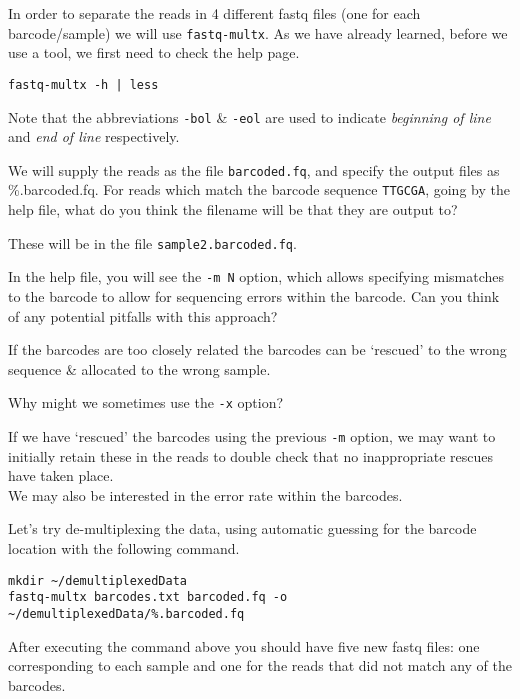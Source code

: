 \begin{steps}
In order to separate the reads in 4 different fastq files (one for each barcode/sample) we will use \texttt{fastq-multx}. 
As we have already learned, before we use a tool, we first need to check the help page.
\begin{lstlisting}
fastq-multx -h | less
\end{lstlisting}
Note that the abbreviations \texttt{-bol} \& \texttt{-eol} are used to indicate \textit{beginning of line} and \textit{end of line} respectively.
\end{steps}

\begin{questions}
We will supply the reads as the file \texttt{barcoded.fq}, and specify the output files as \%.barcoded.fq.
For reads which match the barcode sequence \texttt{TTGCGA}, going by the help file, what do you think the filename will be that they are output to? \\
\begin{answer}
These will be in the file \texttt{sample2.barcoded.fq}.\\
\end{answer}
In the help file, you will see the \texttt{-m N} option, which allows specifying mismatches to the barcode to allow for sequencing errors within the barcode.
Can you think of any potential pitfalls with this approach? \\
\begin{answer}
If the barcodes are too closely related the barcodes can be `rescued' to the wrong sequence \& allocated to the wrong sample. \\
\end{answer}
Why might we sometimes use the \texttt{-x} option? \\ 
\begin{answer}
If we have `rescued' the barcodes using the previous \texttt{-m} option, we may want to initially retain these in the reads to double check that no inappropriate rescues have taken place.\\
We may also be interested in the error rate within the barcodes.\\
\end{answer}
\end{questions}

\begin{steps}
Let's try de-multiplexing the data, using automatic guessing for the barcode location with the following command.\\
\begin{lstlisting}
mkdir ~/demultiplexedData
fastq-multx barcodes.txt barcoded.fq -o ~/demultiplexedData/%.barcoded.fq
\end{lstlisting}
After executing the command above you should have five new fastq files: one corresponding to each sample and one for the reads that did not match any of the barcodes.
\end{steps}

